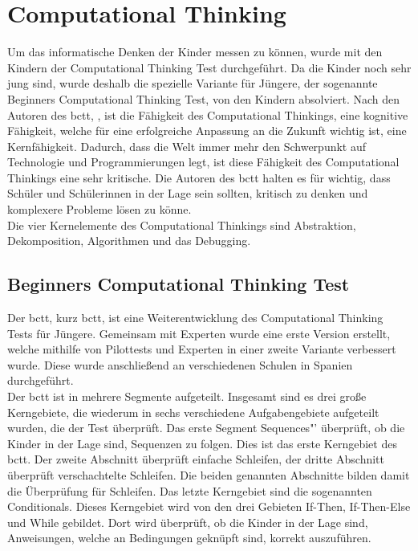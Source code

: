\section{Computational Thinking} \label{sec:ct}
Um das informatische Denken der Kinder messen zu können, wurde mit den Kindern der Computational Thinking Test durchgeführt. Da die Kinder noch sehr jung sind, wurde deshalb die spezielle Variante für Jüngere, der sogenannte Beginners Computational Thinking Test, von den Kindern absolviert. Nach den Autoren des \acrshort{bctt}, \citeauthor{bcct}, ist die Fähigkeit des Computational Thinkings, eine kognitive Fähigkeit, welche für eine erfolgreiche Anpassung an die Zukunft wichtig ist, eine Kernfähigkeit. Dadurch, dass die Welt immer mehr den Schwerpunkt auf Technologie und Programmierungen legt, ist diese Fähigkeit des Computational Thinkings eine sehr kritische. Die Autoren des \acrshort{bctt} halten es für wichtig, dass Schüler und Schülerinnen in der Lage sein sollten, kritisch zu denken und komplexere Probleme lösen zu könne.\\
Die vier Kernelemente des Computational Thinkings sind Abstraktion, Dekomposition, Algorithmen und das Debugging.\\
\cite{bcct} 
\subsection{Beginners Computational Thinking Test}
Der \acrlong{bctt}, kurz \acrshort{bctt}, ist eine Weiterentwicklung des Computational Thinking Tests für Jüngere. Gemeinsam mit Experten wurde eine erste Version erstellt, welche mithilfe von Pilottests und Experten in einer zweite Variante verbessert wurde. Diese wurde anschließend an verschiedenen Schulen in Spanien durchgeführt.\\

Der \acrshort{bctt} ist in mehrere Segmente aufgeteilt. Insgesamt sind es drei große Kerngebiete, die wiederum in sechs verschiedene Aufgabengebiete aufgeteilt wurden, die der Test überprüft. Das erste Segment \glqq Sequences"' überprüft, ob die Kinder in der Lage sind, Sequenzen zu folgen. Dies ist das erste Kerngebiet des \acrshort{bctt}. Der zweite Abschnitt überprüft einfache Schleifen, der dritte Abschnitt überprüft verschachtelte Schleifen. Die beiden genannten Abschnitte bilden damit die Überprüfung für Schleifen. Das letzte Kerngebiet sind die sogenannten Conditionals. Dieses Kerngebiet wird von den drei Gebieten If-Then, If-Then-Else und While gebildet. Dort wird überprüft, ob die Kinder in der Lage sind, Anweisungen, welche an Bedingungen geknüpft sind, korrekt auszuführen.\\

